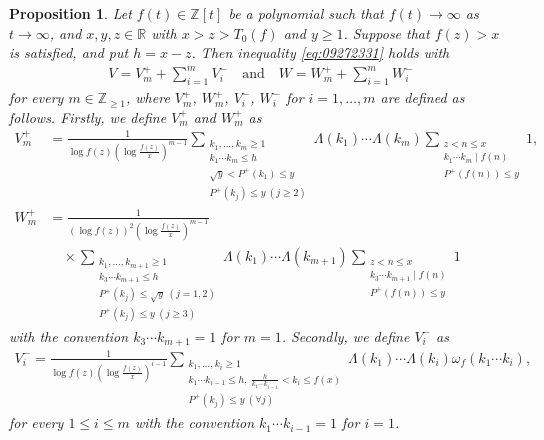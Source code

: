 \documentclass[a4paper,11pt]{amsart}
\newtheorem{proposition}[theorem]{Proposition}
\theoremstyle{definition}
\numberwithin{equation}{section}
\begin{document}
\begin{proposition}\label{prop:3.2}
Let $f(t) \in \mathbb{Z}[t]$ be a polynomial such that $f(t) \to\infty$ as $t \to\infty$, and $x,y,z \in \mathbb{R}$ with $x>z>T_0(f)$ and $y \geq1$. 
Suppose that $f(z)>x$ is satisfied, and put $h=x-z$. 
Then inequality \eqref{eq:09272331} holds with
\begin{align}\label{eq:09291709}
V
= V_m^+ +\sum_{i=1}^{m} V_i^-
\quad\text{and}\quad
W
= W_m^+ +\sum_{i=1}^{m} W_i^-
\end{align}
for every $m \in \mathbb{Z}_{\geq1}$, where $V_m^+$, $W_m^+$, $V_i^-$, $W_i^-$ for $i=1,\ldots,m$ are defined as follows. 
Firstly, we define $V_m^+$ and $W_m^+$ as
\begin{align*}
V_m^+
&= \frac{1}{\log{f(z)} \left(\log{\frac{f(z)}{x}}\right)^{m-1}} 
\sum_{\substack{k_1,\ldots,k_m \geq 1 \\ k_1 \cdots k_m \leq h \\ \sqrt{y} < P^+(k_1) \leq y \\ P^+(k_j) \leq y ~(j \geq 2)}} 
\Lambda(k_1) \cdots \Lambda(k_m) 
\sum_{\substack{z<n \leq x \\ k_1 \cdots k_m \mid f(n) \\ P^+(f(n)) \leq y}} 1, \\
W_m^+
&= \frac{1}{(\log{f(z)})^2 \left(\log{\frac{f(z)}{x}}\right)^{m-1}} \\
&\quad \times
\sum_{\substack{k_1,\ldots,k_{m+1} \geq 1 \\ [k_1,k_2] k_3 \cdots k_{m+1} \leq h \\ P^+(k_j) \leq \sqrt{y} ~(j=1,2) \\ P^+(k_j) \leq y ~(j \geq 3)}} 
\Lambda(k_1) \cdots \Lambda(k_{m+1}) 
\sum_{\substack{z<n \leq x \\ [k_1,k_2] k_3 \cdots k_{m+1} \mid f(n) \\ P^+(f(n)) \leq y}} 1
\end{align*}
with the convention $k_3 \cdots k_{m+1}=1$ for $m=1$. 
Secondly, we define $V_i^-$ as
\begin{align*}
V_i^-
= \frac{1}{\log{f(z)} \left(\log{\frac{f(z)}{x}}\right)^{i-1}} 
\sum_{\substack{k_1,\ldots,k_i \geq 1 \\ k_1 \cdots k_{i-1} \leq h,~ \frac{h}{k_1 \cdots k_{i-1}}<k_i \leq f(x) \\ P^+(k_j) \leq y ~(\forall j)}} 
\Lambda(k_1) \cdots \Lambda(k_i) \omega_f(k_1 \cdots k_i), 
\end{align*}
for every $1 \leq i \leq m$ with the convention $k_1 \cdots k_{i-1}=1$ for $i=1$. 

\end{proposition}
\end{document}
